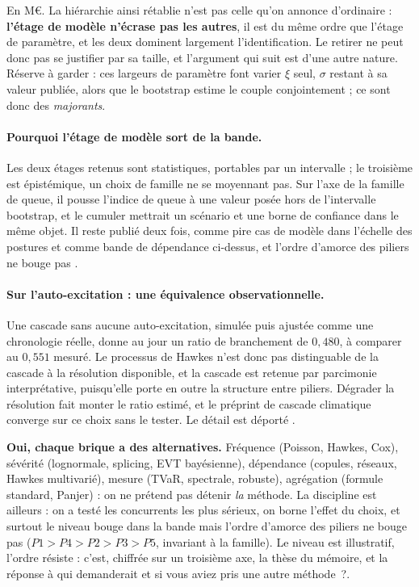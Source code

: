 \vspace{4pt}
\noindent En M\euro. La hiérarchie ainsi rétablie n'est pas celle qu'on annonce d'ordinaire :
\textbf{l'étage de modèle n'écrase pas les autres}, il est du même ordre que l'étage de paramètre,
et les deux dominent largement l'identification. Le retirer ne peut donc pas se justifier par sa
taille, et l'argument qui suit est d'une autre nature. Réserve à garder : ces largeurs de
paramètre font varier $\xi$ seul, $\sigma$ restant à sa valeur publiée, alors que le bootstrap
estime le couple conjointement ; ce sont donc des \emph{majorants}.

\paragraph{Pourquoi l'étage de modèle sort de la bande.} Les deux étages retenus sont
statistiques, portables par un intervalle ; le troisième est épistémique, un choix de famille ne
se moyennant pas. Sur l'axe de la famille de queue, il pousse l'indice de queue à une valeur
posée hors de l'intervalle bootstrap, et le cumuler mettrait un scénario et une borne de
confiance dans le même objet. Il reste publié deux fois, comme pire cas de modèle dans l'échelle
des postures et comme bande de dépendance ci-dessus, et l'ordre d'amorce des piliers ne bouge
pas \matcomp.

\paragraph{Sur l'auto-excitation : une équivalence observationnelle.} Une cascade sans aucune
auto-excitation, simulée puis ajustée comme une chronologie réelle, donne au jour un ratio de
branchement de $0{,}480$, à comparer au $0{,}551$ mesuré. Le processus de Hawkes n'est donc pas
distinguable de la cascade à la résolution disponible, et la cascade est retenue par parcimonie
interprétative, puisqu'elle porte en outre la structure entre piliers. Dégrader la résolution
fait monter le ratio estimé, et le préprint de cascade climatique converge sur ce choix sans le
tester. Le détail est déporté \matcomp.

\begin{cle}
\textbf{Oui, chaque brique a des alternatives.} Fréquence (Poisson, Hawkes, Cox), sévérité
(lognormale, splicing, EVT bayésienne), dépendance (copules, réseaux, Hawkes multivarié),
mesure (TVaR, spectrale, robuste), agrégation (formule standard, Panjer) : on ne prétend pas
détenir \emph{la} méthode. La discipline est ailleurs : on a testé les concurrents les plus
sérieux, on borne l'effet du choix, et surtout le niveau bouge dans la bande mais
l'ordre d'amorce des piliers ne bouge pas ($P1>P4>P2>P3>P5$, invariant à la famille).
Le niveau est illustratif, l'ordre résiste : c'est, chiffrée sur un troisième axe, la thèse du
mémoire, et la réponse à qui demanderait \og et si vous aviez pris une autre méthode~?\fg.
\end{cle}

